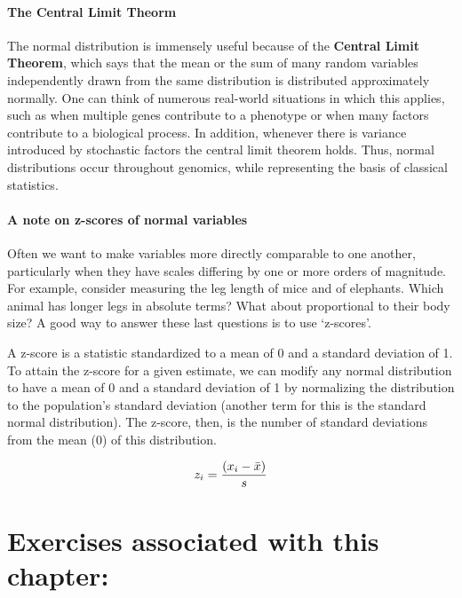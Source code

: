 \documentclass[
]{book}
\begin{document}
\hypertarget{the-central-limit-theorm}{%
\paragraph{The Central Limit Theorm}\label{the-central-limit-theorm}}

The normal distribution is immensely useful because of the \textbf{Central Limit Theorem}, which says that the mean or the sum of many random variables independently drawn from the same distribution is distributed approximately normally. One can think of numerous real-world situations in which this applies, such as when multiple genes contribute to a phenotype or when many factors contribute to a biological process. In addition, whenever there is variance introduced by stochastic factors the central limit theorem holds. Thus, normal distributions occur throughout genomics, while representing the basis of classical statistics.

\hypertarget{a-note-on-z-scores-of-normal-variables}{%
\paragraph{A note on z-scores of normal variables}\label{a-note-on-z-scores-of-normal-variables}}

Often we want to make variables more directly comparable to one another, particularly when they have scales differing by one or more orders of magnitude. For example, consider measuring the leg length of mice and of elephants. Which animal has longer legs in absolute terms? What about proportional to their body size? A good way to answer these last questions is to use `z-scores'.

A z-score is a statistic standardized to a mean of 0 and a standard deviation of 1. To attain the z-score for a given estimate, we can modify any normal distribution to have a mean of 0 and a standard deviation of 1 by normalizing the distribution to the population's standard deviation (another term for this is the standard normal distribution). The z-score, then, is the number of standard deviations from the mean (0) of this distribution.

\[\huge z_i = \frac{(x_i - \bar{x})}{s}\]

\hypertarget{exercises-associated-with-this-chapter-1}{%
\section{Exercises associated with this chapter:}\label{exercises-associated-with-this-chapter-1}}
\end{document}

